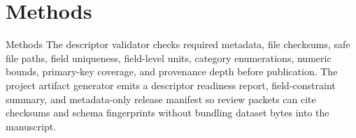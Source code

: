 \documentclass[
  ignorenonframetext,
]{beamer}
\author{\texorpdfstring{}{}}
\date{}
\begin{document}
\section{Methods}\label{methods}

\begin{frame}[allowframebreaks]{Methods}
The descriptor validator checks required metadata, file checksums, safe
file paths, field uniqueness, field-level units, category enumerations,
numeric bounds, primary-key coverage, and provenance depth before
publication. The project artifact generator emits a descriptor readiness
report, field-constraint summary, and metadata-only release manifest so
review packets can cite checksums and schema fingerprints without
bundling dataset bytes into the manuscript.
\end{frame}
\end{document}
